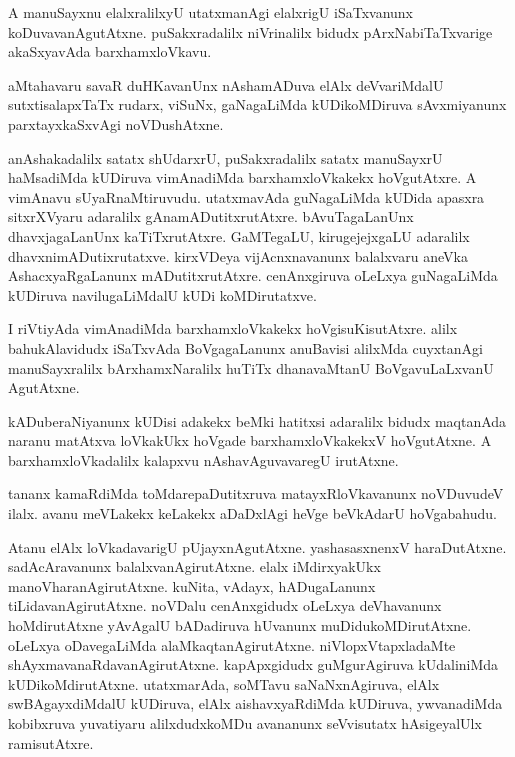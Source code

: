 \documentclass{article}
\begin{document}
\begin{mn}
A manuSayxnu elalxralilxyU utatxmanAgi elalxrigU iSaTxvanunx
koDuvavanAgutAtxne. puSakxradalilx niVrinalilx bidudx
pArxNabiTaTxvarige akaSxyavAda barxhamxloVkavu.
\end{mn}

\begin{mn}
aMtahavaru savaR duHKavanUnx nAshamADuva elAlx deVvariMdalU
sutxtisalapxTaTx rudarx, viSuNx, gaNagaLiMda kUDikoMDiruva
sAvxmiyanunx parxtayxkaSxvAgi noVDushAtxne.
\end{mn}

\begin{mn}
anAshakadalilx satatx shUdarxrU, puSakxradalilx satatx manuSayxrU
haMsadiMda kUDiruva vimAnadiMda barxhamxloVkakekx hoVgutAtxre. A
vimAnavu sUyaRnaMtiruvudu. utatxmavAda guNagaLiMda kUDida apasxra
sitxrXVyaru adaralilx gAnamADutitxrutAtxre. bAvuTagaLanUnx
dhavxjagaLanUnx kaTiTxrutAtxre. GaMTegaLU, kirugejejxgaLU adaralilx
dhavxnimADutixrutatxve. kirxVDeya vijAcnxnavanunx balalxvaru aneVka
AshacxyaRgaLanunx mADutitxrutAtxre. cenAnxgiruva oLeLxya guNagaLiMda
kUDiruva navilugaLiMdalU kUDi koMDirutatxve.
\end{mn}

\begin{mn}
I riVtiyAda vimAnadiMda barxhamxloVkakekx hoVgisuKisutAtxre. alilx
bahukAlavidudx iSaTxvAda BoVgagaLanunx anuBavisi alilxMda  cuyxtanAgi
manuSayxralilx bArxhamxNaralilx huTiTx dhanavaMtanU BoVgavuLaLxvanU AgutAtxne.
\end{mn}

\begin{mn}%
kADuberaNiyanunx kUDisi adakekx beMki hatitxsi adaralilx bidudx
maqtanAda naranu matAtxva loVkakUkx hoVgade barxhamxloVkakekxV
hoVgutAtxne. A barxhamxloVkadalilx kalapxvu nAshavAguvavaregU irutAtxne.
\end{mn}

\begin{mn}%
tananx kamaRdiMda toMdarepaDutitxruva matayxRloVkavanunx noVDuvudeV
ilalx. avanu meVLakekx keLakekx aDaDxlAgi heVge beVkAdarU hoVgabahudu.
\end{mn}

\begin{mn}
Atanu elAlx loVkadavarigU pUjayxnAgutAtxne. yashasasxnenxV
haraDutAtxne. sadAcAravanunx balalxvanAgirutAtxne. elalx iMdirxyakUkx
manoVharanAgirutAtxne. kuNita, vAdayx, hADugaLanunx
tiLidavanAgirutAtxne. noVDalu cenAnxgidudx oLeLxya deVhavanunx
hoMdirutAtxne yAvAgalU bADadiruva hUvanunx
muDidukoMDirutAtxne. oLeLxya oDavegaLiMda
alaMkaqtanAgirutAtxne. niVlopxVtapxladaMte
shAyxmavanaRdavanAgirutAtxne. kapApxgidudx guMgurAgiruva kUdaliniMda
kUDikoMdirutAtxne. utatxmarAda, soMTavu saNaNxnAgiruva, elAlx
swBAgayxdiMdalU kUDiruva,  elAlx aishavxyaRdiMda kUDiruva, ywvanadiMda
kobibxruva yuvatiyaru alilxdudxkoMDu avananunx seVvisutatx
hAsigeyalUlx ramisutAtxre.
\end{mn}
\end{document}
